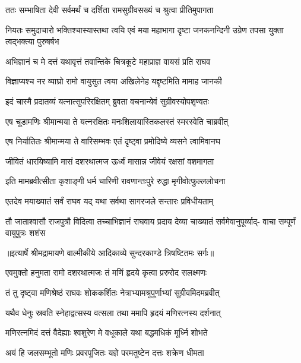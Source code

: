 \twolineshloka
{ततः सम्भाषिता देवी सर्वमर्थं च दर्शिता}
{रामसुग्रीवसख्यं च श्रुत्वा प्रीतिमुपागता} %

\threelineshloka
{नियतः समुदाचारो भक्तिश्चास्यास्तथा त्वयि}
{एवं मया महाभागा दृष्टा जनकनन्दिनी}
{उग्रेण तपसा युक्ता त्वद्भक्त्या पुरुषर्षभ} %

\twolineshloka
{अभिज्ञानं च मे दत्तं यथावृत्तं तवान्तिके}
{चित्रकूटे महाप्राज्ञ वायसं प्रति राघव} %

\twolineshloka
{विज्ञाप्यश्च नर व्याघ्रो रामो वायुसुत त्वया}
{अखिलेनेह यद्दृष्टमिति मामाह जानकी} %

\twolineshloka
{इदं चास्मै प्रदातव्यं यत्नात्सुपरिरक्षितम्}
{ब्रुवता वचनान्येवं सुग्रीवस्योपशृण्वतः} %

\twolineshloka
{एष चूडामणिः श्रीमान्मया ते यत्नरक्षितः}
{मनःशिलायास्तिकलस्तं स्मरस्वेति चाब्रवीत्} %

\twolineshloka
{एष निर्यातितः श्रीमान्मया ते वारिसम्भवः}
{एतं दृष्ट्वा प्रमोदिष्ये व्यसने त्वामिवानघ} %

\twolineshloka
{जीवितं धारयिष्यामि मासं दशरथात्मज}
{ऊर्ध्वं मासान्न जीवेयं रक्षसां वशमागता} %

\twolineshloka
{इति मामब्रवीत्सीता कृशाङ्गी धर्म चारिणी}
{रावणान्तःपुरे रुद्धा मृगीवोत्फुल्ललोचना} %

\twolineshloka
{एतदेव मयाख्यातं सर्वं राघव यद् यथा}
{सर्वथा सागरजले सन्तारः प्रविधीयताम्} %

\fourlineindentedshloka
{तौ जाताश्वासौ राजपुत्रौ विदित्वा}
{तच्चाभिज्ञानं राघवाय प्रदाय}
{देव्या चाख्यातं सर्वमेवानुपूर्व्याद्-}
{वाचा सम्पूर्णं वायुपुत्रः शशंस} %


{॥इत्यार्षे श्रीमद्रामायणे वाल्मीकीये आदिकाव्ये सुन्दरकाण्डे त्रिषष्टितमः सर्गः॥}


\twolineshloka
{एवमुक्तो हनुमता रामो दशरथात्मजः}
{तं मणिं हृदये कृत्वा प्ररुरोद सलक्ष्मणः} %

\twolineshloka
{तं तु दृष्ट्वा मणिश्रेष्ठं राघवः शोककर्शितः}
{नेत्राभ्यामश्रुपूर्णाभ्यां सुग्रीवमिदमब्रवीत्} %

\twolineshloka
{यथैव धेनुः स्रवति स्नेहाद्वत्सस्य वत्सला}
{तथा ममापि हृदयं मणिरत्नस्य दर्शनात्} %

\twolineshloka
{मणिरत्नमिदं दत्तं वैदेह्याः श्वशुरेण मे}
{वधूकाले यथा बद्धमधिकं मूर्ध्नि शोभते} %

\twolineshloka
{अयं हि जलसम्भूतो मणिः प्रवरपूजितः}
{यज्ञे परमतुष्टेन दत्तः शक्रेण धीमता} %

